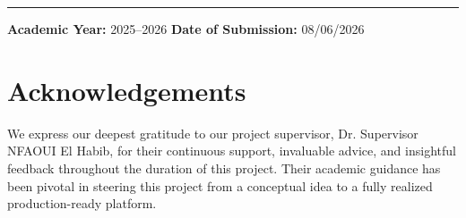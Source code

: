 \documentclass[12pt,a4paper]{report}
\begin{document}
\begin{titlepage}
    \vfill
    \hrule
    \vspace{0.3cm}
    
    {\normalsize \textbf{Academic Year:} 2025--2026 \hfill \textbf{Date of Submission:} 08/06/2026 \par}

\end{titlepage}

\newpage
\thispagestyle{plain}
\begin{abstract}
Designing comprehensive educational curricula that align with rapidly evolving industrial standards is a critical challenge in modern software and technology education. Traditional methods of course design are slow, manual, and often fail to bridge the skill gap between university syllabi and market realities. This report presents \textbf{EduGraph}, an advanced multi-agent educational content design and orchestration platform. EduGraph leverages a team of cooperative, specialized AI agents orchestrated via \textbf{LangGraph} to research, structure, write, and enrich course curricula in real time. 

The core system is implemented through a single, comprehensive generation pipeline consisting of an orchestrator , a market-aware searcher , an educational architect , and an assessment engine . By streaming state transitions and agent messages over WebSockets, the platform delivers a highly responsive, live-rendered learning structure directly to the user. Features such as setting configuration management, generation history persistence, and interactive self-assessment modules are supported via a scalable Next.js and FastAPI architecture. We detail the system design, the coordination protocols between language models, the data schemas, and evaluate the pedagogical framework's feasibility.
\end{abstract}

\newpage
\thispagestyle{plain}
\chapter*{Acknowledgements}
We express our deepest gratitude to our project supervisor, Dr. Supervisor NFAOUI El Habib, for their continuous support, invaluable advice, and insightful feedback throughout the duration of this project. Their academic guidance has been pivotal in steering this project from a conceptual idea to a fully realized production-ready platform.
\end{document}
